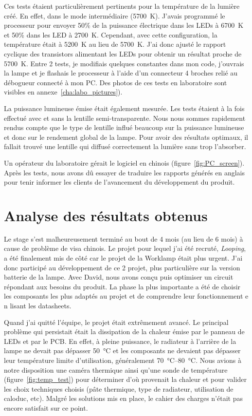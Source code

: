 \documentclass[a4paper, 12pt, sffamily]{report}
\begin{document}
Ces tests étaient particulièrement pertinents pour la température de la lumière créé. En effet, dans le mode intermédiaire (\SI{5700}{\kelvin}). J'avais programmé le processeur pour envoyer 50\% de la puissance électrique dans les LEDs à \SI{6700}{\kelvin} et 50\% dans les LED à \SI{2700}{\kelvin}. Cependant, avec cette configuration, la température était à \SI{5200}{\kelvin} au lieu de \SI{5700}{\kelvin}. J'ai donc ajusté le rapport cyclique des transistors alimentant les LEDs pour obtenir un résultat proche de \SI{5700}{\kelvin}. Entre 2 tests, je modifiais quelques constantes dans mon code, j'ouvrais la lampe et je flashais le processeur à l'aide d'un connecteur 4 broches relié au débogueur connecté à mon PC. Des photos de ces tests en laboratoire sont visibles en annexe~\ref{cha:labo_pictures}).

La puissance lumineuse émise était également mesurée. Les tests étaient à la fois effectué avec et sans la lentille semi-transparente. Nous nous sommes rapidement rendus compte que le type de lentille influé beaucoup sur la puissance lumineuse et donc sur le rendement global de la lampe. Pour avoir des résultats optimaux, il fallait trouvé une lentille qui diffusé correctement la lumière sans trop l'absorber.

Un opérateur du laboratoire gérait le logiciel en chinois (figure~\ref{fig:PC_screen}). Après les tests, nous avons dû essayer de traduire les rapports générés en anglais pour tenir informer les clients de l'avancement du développement du produit.  


\chapter{Analyse des résultats obtenus}

Le stage s'est malheureusement terminé au bout de 4 mois (au lieu de 6 mois) à cause de problème de visa chinois. Le projet pour lequel j'ai été recruté, \emph{Looping}, a été finalement mis de côté car le projet de la Worklamp était plus urgent. J'ai donc participé au développement de ce 2\ieme{} projet, plus particulière sur la version batterie de la lampe. Avec David, nous avons conçu puis optimiser un circuit répondant aux besoins du produit. La phase la plus importante a été de choisir les composants les plus adaptés au projet et de comprendre leur fonctionnement e n lisant les datasheets.

Quand j'ai quitté l'équipe, le projet était extrêmement avancé. Le principal problème qui persistait était la dissipation de la chaleur émise par le panneau de LEDs et par le PCB. En effet, à pleine puissance, le radiateur à l'arrière de la lampe ne devait pas dépasser \SI{50}{\celsius} et les composants ne devaient pas dépasser leur température limite d'utilisation, généralement \SIrange{70}{80}{\celsius}. Nous avions à notre disposition une caméra thermique ainsi qu'une sonde de température (figure~\ref{fig:temp_test}) pour déterminer d'où provenait la chaleur et pour valider les choix techniques choisis (pâte thermique, type de radiateur, utilisation de caloduc, etc). Malgré les solutions mis en place, le cahier des charges n'était pas encore satisfait sur ce point.
\end{document}
